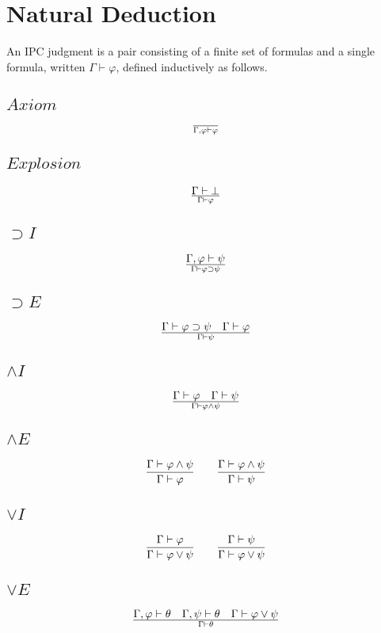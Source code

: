 \documentclass[a4paper,12pt]{paper}
\begin{document}
\section{Natural Deduction} An IPC judgment is a pair consisting of a finite set of formulas and a single formula, written $\Gamma \vdash \varphi$, defined inductively as follows.
\begin{multicols}{2}
	\subsection*{$Axiom$}
	\[ \over \Gamma, \varphi \vdash \varphi \]
	\columnbreak
	\subsection*{$Explosion$}
	\[ \Gamma \vdash \bot \over \Gamma \vdash \varphi \]
	\columnbreak
\end{multicols}
\begin{multicols}{2}
	\subsection*{$\supset I$}
	\[ \Gamma , \varphi \vdash \psi \over \Gamma \vdash \varphi \supset \psi \]
	\columnbreak
	\subsection*{$\supset E$}
	\[ \Gamma \vdash \varphi \supset \psi \quad \Gamma \vdash \varphi \over \Gamma \vdash \psi \]
	\columnbreak
\end{multicols}
\begin{multicols}{2}
	\subsection*{$\land I$}
	\[ \Gamma \vdash \varphi \quad \Gamma \vdash \psi \over \Gamma \vdash \varphi \land \psi \]
	\columnbreak
	\subsection*{$\land E$}
	\[ {\Gamma \vdash \varphi \land \psi \over \Gamma \vdash \varphi}
	 \qquad 
	   {\Gamma \vdash \varphi \land \psi \over \Gamma \vdash \psi} \]
	\columnbreak
\end{multicols}
\begin{multicols}{2}
	\subsection*{$\lor I$}
	\[ {\Gamma \vdash \varphi \over \Gamma \vdash \varphi \lor \psi}
	 \qquad
	   {\Gamma \vdash \psi \over \Gamma \vdash \varphi \lor \psi} \]
	\columnbreak
	\subsection*{$\lor E$}
	\[ \Gamma , \varphi \vdash \theta \quad \Gamma , \psi \vdash \theta \quad \Gamma \vdash \varphi \lor \psi \over \Gamma \vdash \theta \]
	\columnbreak
\end{multicols}
\end{document}
